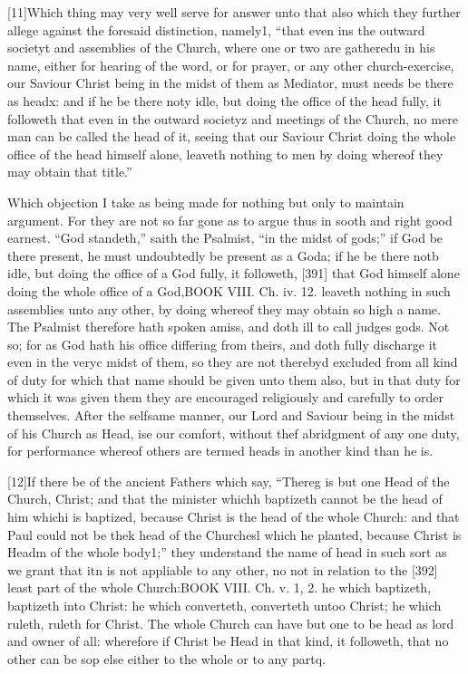 [11]Which thing may very well serve for answer unto that also which they further allege against the foresaid distinction, namely1, “that even ins the outward societyt and assemblies of the Church, where one or two are gatheredu in his name, either for hearing of the word, or for prayer, or any other church-exercise, our Saviour Christ being in the midst of them as Mediator, must needs be there as headx: and if he be there noty idle, but doing the office of the head fully, it followeth that even in the outward societyz and meetings of the Church, no mere man can be called the head of it, seeing that our Saviour Christ doing the whole office of the head himself alone, leaveth nothing to men by doing whereof they may obtain that title.”

Which objection I take as being made for nothing but only to maintain argument. For they are not so far gone as to argue thus in sooth and right good earnest. “God standeth,” saith the Psalmist, “in the midst of gods;” if God be there present, he must undoubtedly be present as a Goda; if he be there notb idle, but doing the office of a God fully, it followeth, [391] that God himself alone doing the whole office of a God,BOOK VIII. Ch. iv. 12. leaveth nothing in such assemblies unto any other, by doing whereof they may obtain so high a name. The Psalmist therefore hath spoken amiss, and doth ill to call judges gods. Not so; for as God hath his office differing from theirs, and doth fully discharge it even in the veryc midst of them, so they are not therebyd excluded from all kind of duty for which that name should be given unto them also, but in that duty for which it was given them they are encouraged religiously and carefully to order themselves. After the selfsame manner, our Lord and Saviour being in the midst of his Church as Head, ise our comfort, without thef abridgment of any one duty, for performance whereof others are termed heads in another kind than he is.

[12]If there be of the ancient Fathers which say, “Thereg is but one Head of the Church, Christ; and that the minister whichh baptizeth cannot be the head of him whichi is baptized, because Christ is the head of the whole Church: and that Paul could not be thek head of the Churchesl which he planted, because Christ is Headm of the whole body1;” they understand the name of head in such sort as we grant that itn is not appliable to any other, no not in relation to the [392] least part of the whole Church:BOOK VIII. Ch. v. 1, 2. he which baptizeth, baptizeth into Christ: he which converteth, converteth untoo Christ; he which ruleth, ruleth for Christ. The whole Church can have but one to be head as lord and owner of all: wherefore if Christ be Head in that kind, it followeth, that no other can be sop else either to the whole or to any partq.


